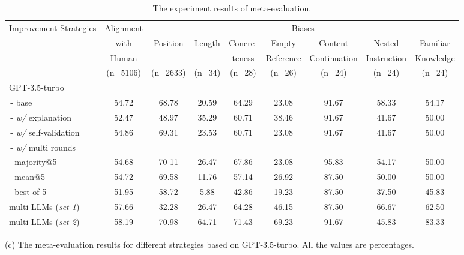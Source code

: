\begin{table}[t]
    \begin{minipage}{\linewidth}
        \begin{adjustbox}{max width=\textwidth}
        \begin{tabular}{lcccccccc}
            \toprule
            \multirow{4}{*}{Improvement Strategies} & Alignment & \multicolumn{7}{c}{Biases} \\
            & with & \multirow{2}{*}{Position} & \multirow{2}{*}{Length} & Concre- & Empty & Content & Nested & Familiar \\
            & Human & & & teness & Reference & Continuation & Instruction & Knowledge \\
            & (n=5106) & (n=2633) & (n=34) & (n=28) & (n=26) & (n=24) & (n=24) & (n=24) \\
            \midrule
            GPT-3.5-turbo & & & & & & & & \\ 
            \,- base & 54.72 & 68.78 & 20.59 & 64.29 & 23.08 & 91.67 & 58.33 & 54.17 \\
            \,- \textit{w/} explanation & 52.47 & 48.97 & 35.29 & 60.71 & 38.46 & 91.67 & 41.67 & 50.00 \\
            \,- \textit{w/} self-validation & 54.86 & 69.31 & 23.53 & 60.71 & 23.08 & 91.67 & 41.67 & 50.00 \\
            \,- \textit{w/} multi rounds & & & & & & & & \\ 
            \qquad- majority@5 & 54.68 & 70
            11 & 26.47 & 67.86 & 23.08 & 95.83 & 54.17 & 50.00 \\
            \qquad- mean@5 & 54.72 & 69.58 & 11.76 & 57.14 & 26.92 & 87.50 & 50.00 & 50.00 \\
            \qquad- best-of-5 & 51.95 & 58.72 & 5.88 & 42.86 & 19.23 & 87.50 & 37.50 & 45.83 \\
            multi LLMs (\textit{set 1}) & 57.66 & 32.28 & 26.47 & 64.28 & 46.15 & 87.50 & 66.67 & 62.50 \\ 
            multi LLMs (\textit{set 2}) & 58.19 & 70.98 & 64.71 & 71.43 & 69.23 & 91.67 & 45.83 & 83.33 \\
            \bottomrule
        \end{tabular}
        \end{adjustbox}
        \caption*{(c) The meta-evaluation results for different strategies based on GPT-3.5-turbo. All the values are percentages.}\label{tb:exp_results_strategies}
        \vspace{-10pt}
    \end{minipage}
    
    \caption{The experiment results of meta-evaluation.}
    \label{tb:all_exp_results}
    \vspace{-20pt}
\end{table}



